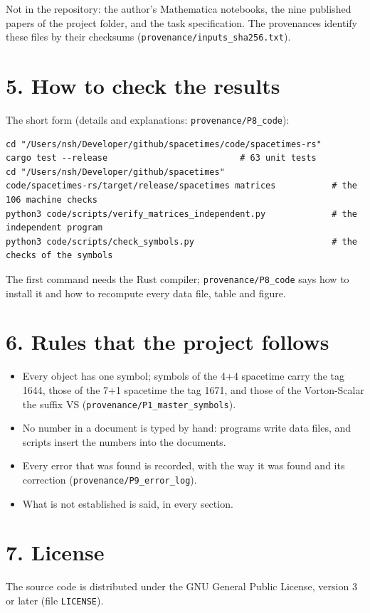 \documentclass[
  10pt,
]{article}
\providecommand{\tightlist}{%
  \setlength{\itemsep}{0pt}\setlength{\parskip}{0pt}}
\begin{document}
Not in the repository: the author's Mathematica notebooks, the nine
published papers of the project folder, and the task specification. The
provenances identify these files by their checksums
(\texttt{provenance/inputs\_sha256.txt}).

\hypertarget{how-to-check-the-results}{%
\section{5. How to check the results}\label{how-to-check-the-results}}

The short form (details and explanations: \texttt{provenance/P8\_code}):

\begin{verbatim}
cd "/Users/nsh/Developer/github/spacetimes/code/spacetimes-rs"
cargo test --release                          # 63 unit tests
cd "/Users/nsh/Developer/github/spacetimes"
code/spacetimes-rs/target/release/spacetimes matrices           # the 106 machine checks
python3 code/scripts/verify_matrices_independent.py             # the independent program
python3 code/scripts/check_symbols.py                           # the checks of the symbols
\end{verbatim}

The first command needs the Rust compiler; \texttt{provenance/P8\_code}
says how to install it and how to recompute every data file, table and
figure.

\hypertarget{rules-that-the-project-follows}{%
\section{6. Rules that the project
follows}\label{rules-that-the-project-follows}}

\begin{itemize}
\tightlist
\item
  Every object has one symbol; symbols of the 4+4 spacetime carry the
  tag 1644, those of the 7+1 spacetime the tag 1671, and those of the
  Vorton-Scalar the suffix VS (\texttt{provenance/P1\_master\_symbols}).
\item
  No number in a document is typed by hand: programs write data files,
  and scripts insert the numbers into the documents.
\item
  Every error that was found is recorded, with the way it was found and
  its correction (\texttt{provenance/P9\_error\_log}).
\item
  What is not established is said, in every section.
\end{itemize}

\hypertarget{license}{%
\section{7. License}\label{license}}

The source code is distributed under the GNU General Public License,
version 3 or later (file \texttt{LICENSE}).
\end{document}
